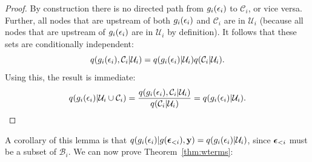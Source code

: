%
\begin{proof}
By construction there is no directed path from $g_i(\epsilon_i)$ to $\mathcal{C}_i$, or vice versa.  Further, all nodes that are upstream of both $g_i(\epsilon_i)$ and $\mathcal{C}_i$ are in $\mathcal{U}_i$ (because all nodes that are upstream of $g_i(\epsilon_i)$ are in $\mathcal{U}_i$ by definition). It follows that these sets are conditionally independent:
\begin{equation*}
q(g_i(\epsilon_i), \mathcal{C}_i | \mathcal{U}_i) = q(g_i(\epsilon_i)| \mathcal{U}_i) q(\mathcal{C}_i | \mathcal{U}_i).
\end{equation*}
Using this, the result is immediate:
\begin{equation*}
q(g_i(\epsilon_i) | \mathcal{U}_i \cup \mathcal{C}_i) 
= \frac{q(g_i(\epsilon_i), \mathcal{C}_i | \mathcal{U}_i)}{q(\mathcal{C}_i | \mathcal{U}_i)} 
= q(g_i(\epsilon_i)| \mathcal{U}_i).
\end{equation*}
\end{proof}
%
A corollary of this lemma is that $q(g_i(\epsilon_i) | g(\bm{\epsilon}_{<i}), \mathbf{y}) = q(g_i(\epsilon_i) | \mathcal{U}_i)$, since $\bm{\epsilon}_{<i}$ must be a subset of $\mathcal{B}_i$.
We can now prove Theorem~\ref{thm:wterms}:

